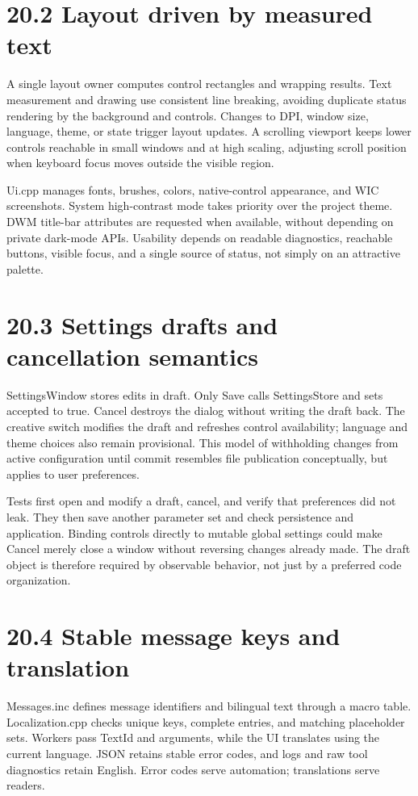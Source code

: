 \documentclass[11pt,a4paper,openany]{book}
\begin{document}
\section*{20.2 Layout driven by measured text}
A single layout owner computes control rectangles and wrapping results. Text measurement and drawing use consistent line breaking, avoiding duplicate status rendering by the background and controls. Changes to DPI, window size, language, theme, or state trigger layout updates. A scrolling viewport keeps lower controls reachable in small windows and at high scaling, adjusting scroll position when keyboard focus moves outside the visible region.

Ui.cpp manages fonts, brushes, colors, native-control appearance, and WIC screenshots. System high-contrast mode takes priority over the project theme. DWM title-bar attributes are requested when available, without depending on private dark-mode APIs. Usability depends on readable diagnostics, reachable buttons, visible focus, and a single source of status, not simply on an attractive palette.


\section*{20.3 Settings drafts and cancellation semantics}
SettingsWindow stores edits in draft. Only Save calls SettingsStore and sets accepted to true. Cancel destroys the dialog without writing the draft back. The creative switch modifies the draft and refreshes control availability; language and theme choices also remain provisional. This model of withholding changes from active configuration until commit resembles file publication conceptually, but applies to user preferences.

Tests first open and modify a draft, cancel, and verify that preferences did not leak. They then save another parameter set and check persistence and application. Binding controls directly to mutable global settings could make Cancel merely close a window without reversing changes already made. The draft object is therefore required by observable behavior, not just by a preferred code organization.


\section*{20.4 Stable message keys and translation}
Messages.inc defines message identifiers and bilingual text through a macro table. Localization.cpp checks unique keys, complete entries, and matching placeholder sets. Workers pass TextId and arguments, while the UI translates using the current language. JSON retains stable error codes, and logs and raw tool diagnostics retain English. Error codes serve automation; translations serve readers.
\end{document}
